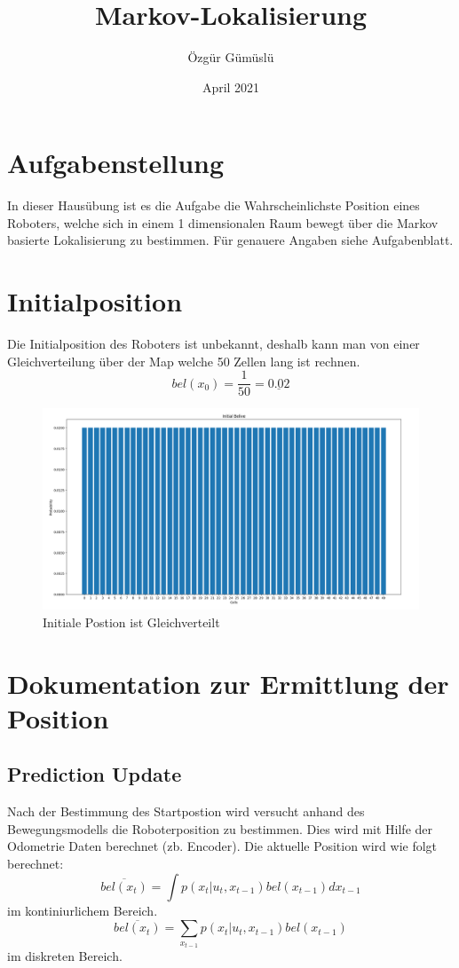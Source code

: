 \documentclass[12pt]{article}
\title{Markov-Lokalisierung}
\author{Özgür Gümüslü}
\date{April 2021}
\begin{document}
\maketitle
\tableofcontents
\newpage

\section{Aufgabenstellung}
In dieser Hausübung ist es die Aufgabe die Wahrscheinlichste Position eines Roboters, welche sich in einem 1 dimensionalen Raum bewegt über die Markov basierte Lokalisierung zu bestimmen. Für genauere Angaben siehe Aufgabenblatt.

\section{Initialposition}
Die Initialposition des Roboters ist unbekannt, deshalb kann man von einer Gleichverteilung über der Map welche 50 Zellen lang ist rechnen.
$$bel(x_0) = \frac{1}{50} = \underline{0.02}$$

\begin{figure}[h]
    \centering
    \includegraphics[width=1.3\textwidth]{img/bel(x0).png}
    \caption{Initiale Postion ist Gleichverteilt}
    \label{fig:Initiale Position}
\end{figure}

\section{Dokumentation zur Ermittlung der Position}
\subsection{Prediction Update}
Nach der Bestimmung des Startpostion wird versucht anhand des Bewegungsmodells die Roboterposition zu bestimmen. Dies wird mit Hilfe der Odometrie Daten berechnet (zb. Encoder). Die aktuelle Position wird wie folgt berechnet:
$$\overline{bel(x_t)} = \int p(x_t|u_t, x_{t-1})bel(x_{t-1})dx_{t-1}$$ im kontiniurlichem Bereich.
$$\overline{bel(x_t)} = \sum\limits_{x_{t-1}}p(x_t|u_t, x_{t-1})bel(x_{t-1})$$ im diskreten Bereich.\\
\end{document}
